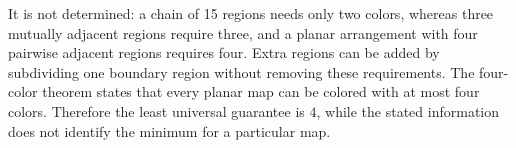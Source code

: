 It is not determined: a chain of 15 regions needs only two colors, whereas three mutually adjacent regions require three, and a planar arrangement with four pairwise adjacent regions requires four. Extra regions can be added by subdividing one boundary region without removing these requirements. The four-color theorem states that every planar map can be colored with at most four colors. Therefore the least universal guarantee is $\boxed 4$, while the stated information does not identify the minimum for a particular map.
